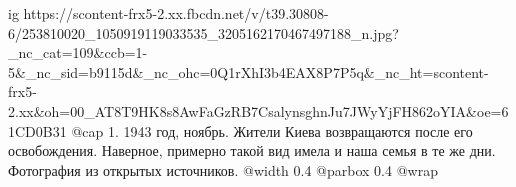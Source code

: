  
 
 
 
 

\ifcmt
  ig https://scontent-frx5-2.xx.fbcdn.net/v/t39.30808-6/253810020_1050919119033535_3205162170467497188_n.jpg?_nc_cat=109&ccb=1-5&_nc_sid=b9115d&_nc_ohc=0Q1rXhI3b4EAX8P7P5q&_nc_ht=scontent-frx5-2.xx&oh=00_AT8T9HK8s8AwFaGzRB7CsalynsghnJu7JWyYjFH862oYIA&oe=61CD0B31
  @cap 1. 1943 год, ноябрь. Жители Киева возвращаются после его освобождения. Наверное, примерно такой вид имела и наша семья в те же дни. Фотография из открытых источников. 
  @width 0.4
  @parbox 0.4
  @wrap \parpic[r]
\fi
